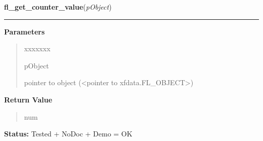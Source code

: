 \hspace{.8\funcindent}\begin{boxedminipage}{\funcwidth}

    \raggedright \textbf{fl\_get\_counter\_value}(\textit{pObject})

    \vspace{-1.5ex}

    \rule{\textwidth}{0.5\fboxrule}
\setlength{\parskip}{2ex}
\setlength{\parskip}{1ex}
      \textbf{Parameters}
      \vspace{-1ex}

      \begin{quote}
        \begin{Ventry}{xxxxxxx}

          \item[pObject]

          pointer to object ({\textless}pointer to 
          xfdata.FL\_OBJECT{\textgreater})

        \end{Ventry}

      \end{quote}

      \textbf{Return Value}
    \vspace{-1ex}

      \begin{quote}
      num

      \end{quote}

\textbf{Status:} Tested + NoDoc + Demo = OK



    \end{boxedminipage}

    \label{xformslib:library:fl_get_counter_bounds}

    \vspace{0.5ex}

